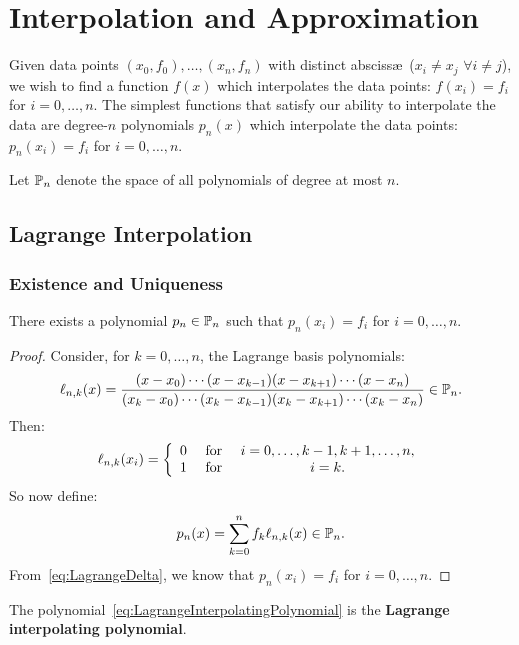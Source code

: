 \chapter{Interpolation and Approximation}\label{chapter:InterpolationApproximation}

Given data points $(x_0,f_0),\ldots,(x_n,f_n)$ with distinct absciss\ae~($x_i\ne x_j$ $\forall i\ne j$), we wish to find a function $f(x)$ which interpolates the data points: $f(x_i) = f_i$ for $i=0,\ldots,n$. The simplest functions that satisfy our ability to interpolate the data are degree-$n$ polynomials $p_n(x)$ which interpolate the data points: $p_n(x_i) = f_i$ for $i=0,\ldots,n$.

Let $\P_n$ denote the space of all polynomials of degree at most $n$.

\section{Lagrange Interpolation}

\subsection{Existence and Uniqueness}

\begin{theorem}\label{theorem:polyexistence}
There exists a polynomial $p_n\in\P_n$ such that $p_n(x_i) = f_i$ for $i=0,\ldots,n$.
\end{theorem}
\begin{proof}
Consider, for $k=0,\ldots,n$, the Lagrange basis polynomials:
\begin{equation}\label{eq:LagrangeBasisPolynomial}
\ell_{n,k}(x) = \dfrac{(x-x_0)\cdots(x-x_{k-1})(x-x_{k+1})\cdots(x-x_n)}{(x_k-x_0)\cdots(x_k-x_{k-1})(x_k-x_{k+1})\cdots(x_k-x_n)}\in\P_n.
\end{equation}
Then:
\begin{equation}\label{eq:LagrangeDelta}
\ell_{n,k}(x_i) = \left\{\begin{array}{ccc} 0 & \for & i = 0,\ldots,k-1,k+1,\ldots,n,\\ 1 & \for & i=k.\end{array}\right.
\end{equation}
So now define:
\begin{equation}\label{eq:LagrangeInterpolatingPolynomial}
p_n(x) = \sum_{k=0}^n f_k \ell_{n,k}(x) \in \P_n.
\end{equation}
From~\eqref{eq:LagrangeDelta}, we know that $p_n(x_i) = f_i$ for $i=0,\ldots,n$.
\end{proof}
The polynomial~\eqref{eq:LagrangeInterpolatingPolynomial} is the {\bf Lagrange interpolating polynomial}.

